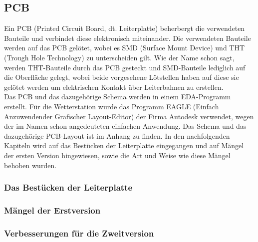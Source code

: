 \subsection{PCB}
\label{subsec:PCB}
Ein PCB (Printed Circuit Board, dt. Leiterplatte) beherbergt die verwendeten Bauteile und verbindet diese elektronisch miteinander. Die verwendeten Bauteile werden auf das PCB gelötet, wobei es SMD (Surface Mount Device) und THT (Trough Hole Technology) zu unterscheiden gilt. Wie der Name schon sagt, werden THT-Bauteile durch das PCB gesteckt und SMD-Bauteile lediglich auf die Oberfläche gelegt, wobei beide vorgesehene Lötstellen haben auf diese sie gelötet werden um elektrischen Kontakt über Leiterbahnen zu erstellen.\\
Das PCB und das dazugehörige Schema werden in einem EDA-Programm erstellt. Für die Wetterstation wurde das Programm EAGLE (Einfach Anzuwendender Grafischer Layout-Editor) der Firma Autodesk verwendet, wegen der im Namen schon angedeuteten einfachen Anwendung. Das Schema und das dazugehörige PCB-Layout ist im Anhang zu finden.  In den nachfolgenden Kapiteln wird auf das Bestücken der Leiterplatte eingegangen und auf Mängel der ersten Version hingewiesen, sowie die Art und Weise wie diese Mängel behoben wurden.
\subsubsection{Das Bestücken der Leiterplatte}
\subsubsection{Mängel der Erstversion}
\subsubsection{Verbesserungen für die Zweitversion}

